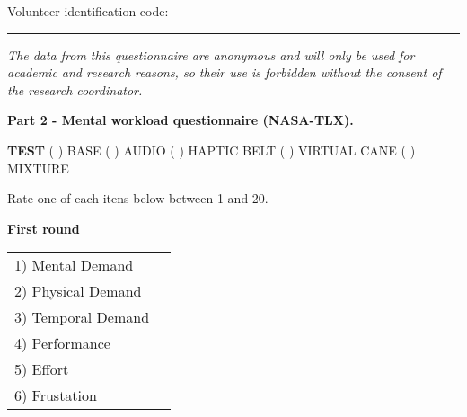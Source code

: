{\color{gray}

Volunteer identification code: \rule{1in}{.2mm}

\textit{The data from this questionnaire are anonymous and will only be used for academic and research reasons, so their use is forbidden without the consent of the research coordinator.}
}

\begin{center}
\textbf{Part 2 - Mental workload questionnaire (NASA-TLX).}
\end{center}

\noindent
\textbf{TEST} ( ) BASE \hfill ( ) AUDIO \hfill ( ) HAPTIC BELT \hfill ( ) VIRTUAL CANE \hfill ( ) MIXTURE

Rate one of each itens below between 1 and 20.

\hspace{1cm}

%
%
%
%
%
%
%
%
%
%
%
%
%
%
%
%
%
\textbf{First round}

\begin{table}[!h]
    \centering
    \def\arraystretch{0.5}
    \begin{tabular}{m{} m{}}
        1) Mental Demand & \\
        2) Physical Demand & \\
        3) Temporal Demand & \\
        4) Performance     & \\
        5) Effort        & \\
        6) Frustation     & \\
    \end{tabular}
\end{table}

